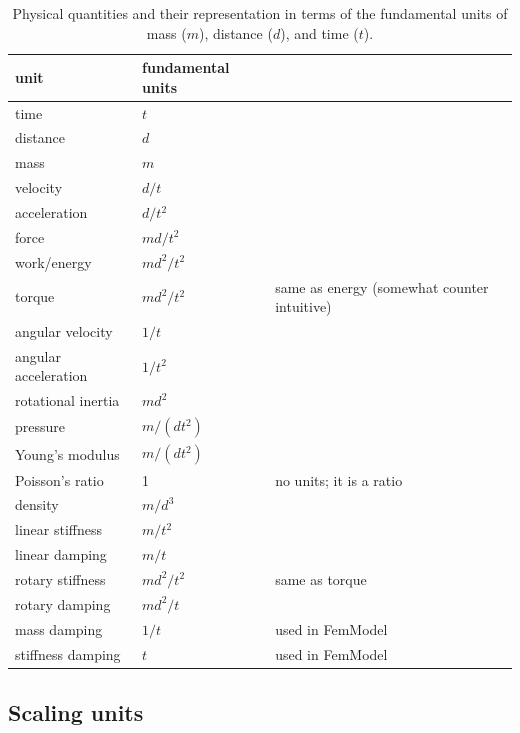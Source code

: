 \begin{table}
\begin{center}
\begin{tabular}{|lll|}
\hline
unit & fundamental units & \\
\hline
time                    & $t$ & \\
distance                & $d$ & \\
mass                    & $m$ & \\
velocity                & $d/t$ & \\
acceleration            & $d/t^2$ & \\
force                   & $m d/t^2$ & \\
work/energy             & $m d^2/t^2$& \\
torque                  & $m d^2/t^2$ & same as energy (somewhat counter intuitive)\\
angular velocity        & $1/t$ & \\
angular acceleration    & $1/t^2$ & \\
rotational inertia      & $m d^2$ & \\
pressure                & $m/(d t^2)$ & \\
Young's modulus         & $m/(d t^2)$ & \\
Poisson's ratio         & 1 & no units; it is a ratio \\
density                 & $m/d^3$ & \\
linear stiffness        & $m/t^2$ & \\
linear damping          & $m/t$ & \\
rotary stiffness        & $m d^2/t^2$ & same as torque \\
rotary damping          & $m d^2/t$ & \\
mass damping            & $1/t$ & used in FemModel \\
stiffness damping       & $t$ & used in FemModel \\
\hline
\end{tabular}
\end{center}
\caption{Physical quantities and their representation in terms of the
fundamental units of mass ($m$), distance ($d$), and time ($t$).}
\label{Units:tab}
\end{table}

\subsection{Scaling units}

